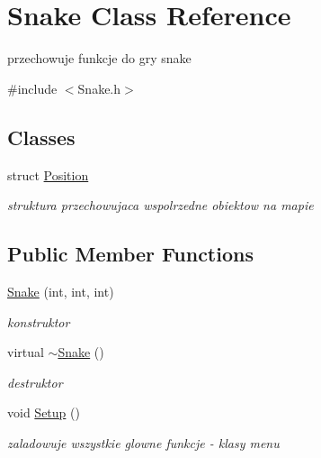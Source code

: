 \hypertarget{class_snake}{}\section{Snake Class Reference}
\label{class_snake}


przechowuje funkcje do gry snake  




{\ttfamily \#include $<$Snake.\+h$>$}

\subsection*{Classes}
\begin{DoxyCompactItemize}
\item 
struct \mbox{\hyperlink{struct_snake_1_1_position}{Position}}
\begin{DoxyCompactList}\small\item\em struktura przechowujaca wspolrzedne obiektow na mapie \end{DoxyCompactList}\end{DoxyCompactItemize}
\subsection*{Public Member Functions}
\begin{DoxyCompactItemize}
\item 
\mbox{\hyperlink{class_snake_a1a20482bb3288419cb4754644238278d}{Snake}} (int, int, int)
\begin{DoxyCompactList}\small\item\em konstruktor \end{DoxyCompactList}\item 
\mbox{\label{class_snake_ada3eac2be422d8a28be5a291ee6038dd}} 
virtual \mbox{\hyperlink{class_snake_ada3eac2be422d8a28be5a291ee6038dd}{$\sim$\+Snake}} ()
\begin{DoxyCompactList}\small\item\em destruktor \end{DoxyCompactList}\item 
\mbox{\label{class_snake_a8089601a5766b40c737af82e3234b286}} 
void \mbox{\hyperlink{class_snake_a8089601a5766b40c737af82e3234b286}{Setup}} ()
\begin{DoxyCompactList}\small\item\em zaladowuje wszystkie glowne funkcje -\/ klasy menu \end{DoxyCompactList}\end{DoxyCompactItemize}
